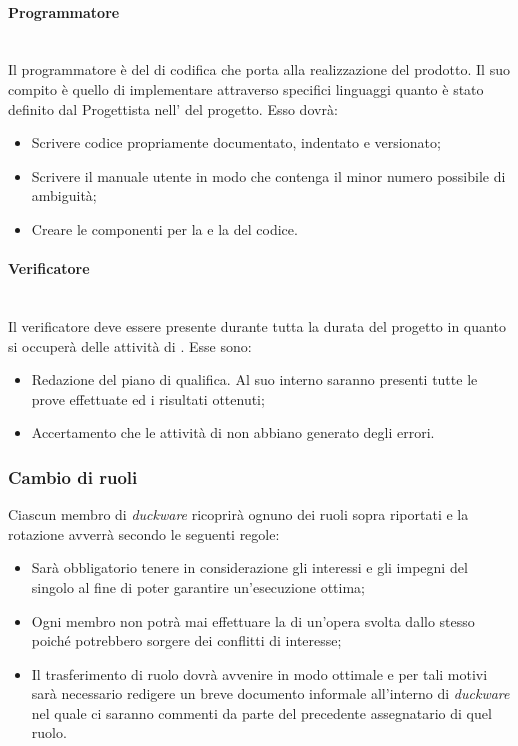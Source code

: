 \paragraph{Programmatore}\mbox{}\\[0.4cm]
Il programmatore è  del  di codifica che porta alla realizzazione del prodotto. Il suo compito è quello di implementare attraverso specifici linguaggi quanto è stato definito dal Progettista nell’ del progetto. Esso dovrà:
\begin{itemize}
    \item Scrivere codice propriamente documentato, indentato e versionato;
    \item Scrivere il manuale utente in modo che contenga il minor numero possibile di ambiguità;
    \item Creare le componenti per la  e la  del codice.
\end{itemize}

\paragraph{Verificatore}\mbox{}\\[0.4cm]
Il verificatore deve essere presente durante tutta la durata del progetto in quanto si occuperà delle attività di . Esse sono:
\begin{itemize}
    \item Redazione del piano di qualifica. Al suo interno saranno presenti tutte le prove effettuate ed i risultati ottenuti;
    \item Accertamento  che le attività di  non abbiano generato degli errori.
\end{itemize}

\subsubsection{Cambio di ruoli}
Ciascun membro di \emph{duckware} ricoprirà ognuno dei ruoli sopra riportati e la rotazione avverrà secondo le seguenti regole:
\begin{itemize}
    \item Sarà obbligatorio tenere in considerazione gli interessi e gli impegni del singolo al fine di poter garantire un’esecuzione ottima;
    \item Ogni membro non potrà mai effettuare la  di un’opera svolta dallo stesso poiché potrebbero sorgere dei conflitti di interesse;
    \item Il trasferimento di ruolo dovrà avvenire in modo ottimale e per tali motivi sarà necessario redigere un breve documento informale all’interno di \emph{duckware} nel quale ci saranno commenti da parte del precedente assegnatario di quel ruolo.
\end{itemize}


